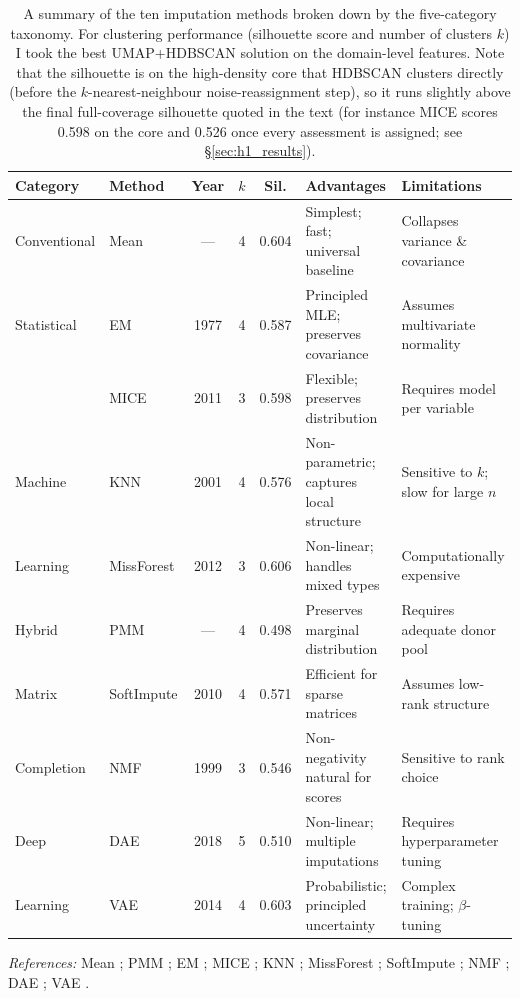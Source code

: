 \begin{table}[htbp]
\caption{A summary of the ten imputation methods broken down by the five-category taxonomy. For clustering performance (silhouette score and number of clusters $k$) I took the best UMAP+HDBSCAN solution on the domain-level features. Note that the silhouette is on the high-density core that HDBSCAN clusters directly (before the $k$-nearest-neighbour noise-reassignment step), so it runs slightly above the final full-coverage silhouette quoted in the text (for instance MICE scores 0.598 on the core and 0.526 once every assessment is assigned; see §\ref{sec:h1_results}).}
\label{tab:method_summary}
\centering
\scriptsize
\renewcommand{\arraystretch}{1.4}
\begin{tabular}{@{} p{1.8cm} l c c c p{3.2cm} p{3cm} @{}}
\toprule
\textbf{Category} & \textbf{Method} & \textbf{Year} & \textbf{$k$} & \textbf{Sil.} & \textbf{Advantages} & \textbf{Limitations} \\
\midrule
Conventional & Mean       & ---  & 4 & 0.604 & Simplest; fast; universal baseline & Collapses variance \& covariance \\
Statistical  & EM         & 1977 & 4 & 0.587 & Principled MLE; preserves covariance & Assumes multivariate normality \\
             & MICE       & 2011 & 3 & 0.598 & Flexible; preserves distribution & Requires model per variable \\
\midrule
Machine      & KNN        & 2001 & 4 & 0.576 & Non-parametric; captures local structure & Sensitive to $k$; slow for large $n$ \\
Learning     & MissForest & 2012 & 3 & 0.606 & Non-linear; handles mixed types & Computationally expensive \\
\midrule
Hybrid       & PMM        & ---  & 4 & 0.498 & Preserves marginal distribution & Requires adequate donor pool \\
\midrule
Matrix       & SoftImpute & 2010 & 4 & 0.571 & Efficient for sparse matrices & Assumes low-rank structure \\
Completion   & NMF        & 1999 & 3 & 0.546 & Non-negativity natural for scores & Sensitive to rank choice \\
\midrule
Deep         & DAE        & 2018 & 5 & 0.510 & Non-linear; multiple imputations & Requires hyperparameter tuning \\
Learning     & VAE        & 2014 & 4 & 0.603 & Probabilistic; principled uncertainty & Complex training; $\beta$-tuning \\
\bottomrule
\end{tabular}

\vspace{0.5em}
\raggedright
\scriptsize
\textit{References:} Mean \parencite{little2019statistical}; PMM \parencite{vanbuuren2011mice}; EM \parencite{dempster1977maximum}; MICE \parencite{vanbuuren2011mice}; KNN \parencite{troyanskaya2001missing}; MissForest \parencite{stekhoven2012missforest}; SoftImpute \parencite{mazumder2010spectral}; NMF \parencite{lee1999learning}; DAE \parencite{gondara2018mida}; VAE \parencite{kingma2014auto, mccoy2018variational}.
\end{table}

